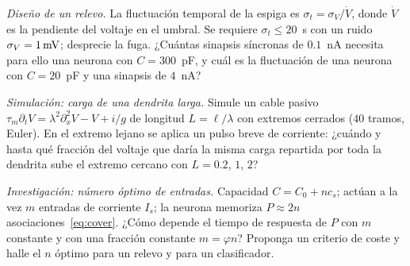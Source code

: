 \begin{exercise}[\lvlB]
\label{ex:19:5}
\emph{Diseño de un relevo.} La fluctuación temporal de la espiga es $\sigma_t=\sigma_V/\dot V$, donde $\dot V$ es la pendiente del voltaje en el umbral. Se requiere $\sigma_t\le20$~\textmu s con un ruido $\sigma_V=1\,\text{mV}$; desprecie la fuga. ¿Cuántas sinapsis síncronas de $0.1$~nA necesita para ello una neurona con $C=300$~pF, y cuál es la fluctuación de una neurona con $C=20$~pF y una sinapsis de $4$~nA?
\end{exercise}

\begin{exercise}[\lvlB]
\label{ex:19:6}
\emph{Simulación: carga de una dendrita larga.} Simule un cable pasivo $\tau_m\partial_tV=\lambda^2\partial_x^2V-V+i/g$ de longitud $L=\ell/\lambda$ con extremos cerrados ($40$ tramos, Euler). En el extremo lejano se aplica un pulso breve de corriente: ¿cuándo y hasta qué fracción del voltaje que daría la misma carga repartida por toda la dendrita sube el extremo cercano con $L=0.2$, $1$, $2$?
\end{exercise}

\begin{exercise}[\lvlC]
\label{ex:19:7}
\emph{Investigación: número óptimo de entradas.} Capacidad $C=C_0+nc_s$; actúan a la vez $m$ entradas de corriente $I_s$; la neurona memoriza $P\approx2n$ asociaciones~\eqref{eq:cover}. ¿Cómo depende el tiempo de respuesta de $P$ con $m$ constante y con una fracción constante $m=\varphi n$? Proponga un criterio de coste y halle el $n$ óptimo para un relevo y para un clasificador.
\end{exercise}

